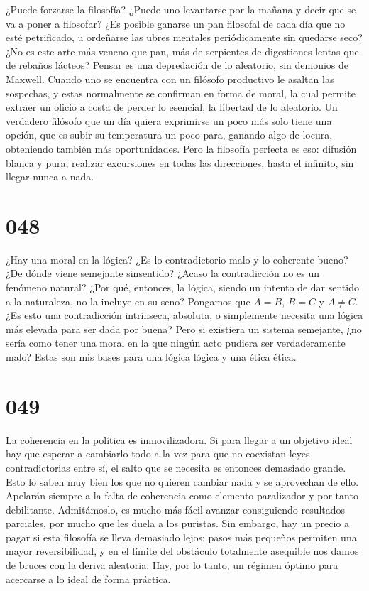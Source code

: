 \documentclass[a4paper,11pt,openright,twocolumn]{book}
\begin{document}
¿Puede forzarse la filosofía? ¿Puede uno levantarse por la mañana y decir que se va a poner a filosofar? ¿Es posible ganarse un pan filosofal de cada día que no esté petrificado, u ordeñarse las ubres mentales periódicamente sin quedarse seco? ¿No es este arte más veneno que pan, más de serpientes de digestiones lentas que de rebaños lácteos? Pensar es una depredación de lo aleatorio, sin demonios de Maxwell. Cuando uno se encuentra con un filósofo productivo le asaltan las sospechas, y estas normalmente se confirman en forma de moral, la cual permite extraer un oficio a costa de perder lo esencial, la libertad de lo aleatorio. Un verdadero filósofo que un día quiera exprimirse un poco más solo tiene una opción, que es subir su temperatura un poco para, ganando algo de locura, obteniendo también más oportunidades. Pero la filosofía perfecta es eso: difusión blanca y pura, realizar excursiones en todas las direcciones, hasta el infinito, sin llegar nunca a nada.

\section*{048}

¿Hay una moral en la lógica? ¿Es lo contradictorio malo y lo coherente bueno? ¿De dónde viene semejante sinsentido?  ¿Acaso la contradicción no es un fenómeno natural? ¿Por qué, entonces, la lógica, siendo un
intento de dar sentido a la naturaleza, no la incluye en su seno? Pongamos que \(A=B\), \(B=C\) y \(A\neq C\). ¿Es esto una contradicción intrínseca, absoluta, o simplemente necesita una lógica más elevada para ser dada por buena? Pero si existiera un sistema semejante, ¿no sería como tener una moral en la que ningún acto pudiera ser verdaderamente malo? Estas son mis bases para una lógica lógica y una ética ética.

\section*{049}

La coherencia en la política es inmovilizadora. Si para llegar a un objetivo ideal hay que esperar a cambiarlo todo a la vez para que no coexistan leyes contradictorias entre sí, el salto que se necesita es entonces demasiado grande. Esto lo saben muy bien los que no quieren cambiar nada y se aprovechan de ello. Apelarán siempre a la falta de coherencia como elemento paralizador y por tanto debilitante. Admitámoslo, es mucho más fácil avanzar consiguiendo resultados parciales, por mucho que les duela a los puristas. Sin embargo, hay un precio a pagar si esta filosofía se lleva demasiado lejos: pasos más pequeños permiten una mayor reversibilidad, y en el límite del obstáculo totalmente asequible nos damos de bruces con la deriva aleatoria. Hay, por lo tanto, un régimen óptimo para acercarse a lo ideal de forma práctica.
\end{document}

